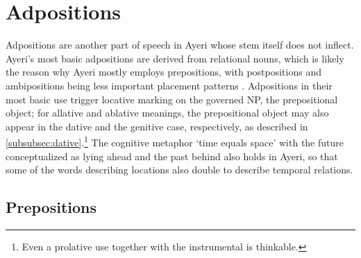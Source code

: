 

\section{Adpositions}

Adpositions are another part of speech in Ayeri whose stem itself does not 
inflect. Ayeri's most basic adpositions are derived from relational nouns, 
which is likely the reason why Ayeri mostly employs prepositions, with 
postpositions and ambipositions being less important placement patterns 
\parencites[110--111]{hagege2010}[81\psqq]{lehmann2015}. Adpositions in their 
most basic use trigger locative marking on the governed NP, the prepositional
object; for allative and ablative meanings, the prepositional object may also
appear in the dative and the genitive case, respectively, as described in
\autoref{subsubsec:dative}.\footnote{Even a prolative use together with the
instrumental is thinkable.} The cognitive metaphor `time equals space' with the
future conceptualized as lying ahead and the past behind also holds in Ayeri,
so that some of the words describing locations also double to describe temporal
relations.

\subsection{Prepositions}

